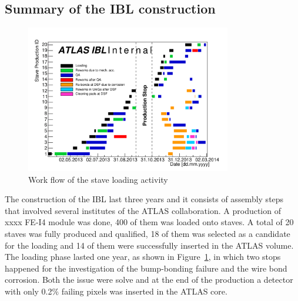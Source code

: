 \subsection{Summary of the IBL construction}
\begin{figure}
\centering
\includegraphics[width=0.8\textwidth]{Images/ibl_stave_loading/Conclusions/workFlow.pdf}
\caption{Work flow of the stave loading activity}
\label{pic:workflow}
\end{figure}
The construction of the IBL last three years and it consists of assembly steps that involved several institutes of the ATLAS collaboration. A production of xxxx FE-I4 module was done, 400 of them was loaded onto staves.
A total of 20 staves was fully produced and qualified, 18 of them was selected as a candidate for the loading and 14 of them were successfully inserted in the ATLAS volume.
The loading phase lasted one year, as shown in Figure~\ref{pic:workflow}, in which two stops happened for the investigation of the bump-bonding failure and the wire bond corrosion. Both the issue were solve and at the end of the production a detector with only 0.2$\percent$ failing pixels was inserted in the ATLAS core.
\pagebreak